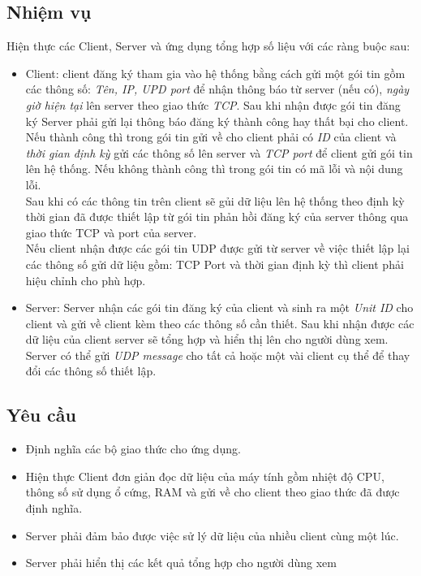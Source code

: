 \documentclass[a4paper,11pt]{extarticle}
\begin{document}
\subsection{Nhiệm vụ}
Hiện thực các Client, Server và ứng dụng tổng hợp số liệu với các ràng buộc sau: 
\begin{itemize}[noitemsep]
    \item Client: client đăng ký tham gia vào hệ thống bằng cách gửi một gói tin gồm các thông số: \emph{Tên, IP, UPD port} để nhận thông báo từ server (nếu có), \emph{ngày giờ hiện tại} lên server theo giao thức \emph{TCP}. Sau khi nhận được gói tin đăng ký Server phải gửi lại thông báo đăng ký thành công hay thất bại cho client. Nếu thành công thì trong gói tin gửi về cho client phải có \emph{ID} của client và \emph{thời gian định kỳ} gửi các thông số lên server và \emph{TCP port} để client gửi gói tin lên hệ thống. Nếu không thành công thì trong gói tin có mã lỗi và nội dung lỗi. \\
    Sau khi có các thông tin trên client sẽ gủi dữ liệu lên hệ thống theo định kỳ thời gian đã được thiết lập từ gói tin phản hồi đăng ký của server thông qua giao thức TCP và port của server. \\
    Nếu client nhận được các gói tin UDP được gửi từ server về việc thiết lập lại các thông số gửi dữ liệu gồm: TCP Port và thời gian định kỳ thì client phải hiệu chỉnh cho phù hợp.    
    \item Server: Server nhận các gói tin đăng ký của client và sinh ra một \emph{Unit ID} cho client và gửi về client kèm theo các thông số cần thiết. Sau khi nhận được các dữ liệu của client server sẽ tổng hợp và hiển thị lên cho người dùng xem. Server có thể gửi \emph{UDP message} cho tất cả hoặc một vài client cụ thể để thay đổi các thông số thiết lập.
\end{itemize}

\subsection{Yêu cầu}
\begin{itemize}[noitemsep]
    \item Định nghĩa các bộ giao thức cho ứng dụng.
    \item Hiện thực Client đơn giản đọc dữ liệu của máy tính gồm nhiệt độ CPU, thông số sử dụng ổ cứng, RAM và gửi về cho client theo giao thức đã được định nghĩa.
    \item Server phải đảm bảo được việc sử lý dữ liệu của nhiều client cùng một lúc.
    \item Server phải hiển thị các kết quả tổng hợp cho người dùng xem
\end{itemize}
\end{document}
